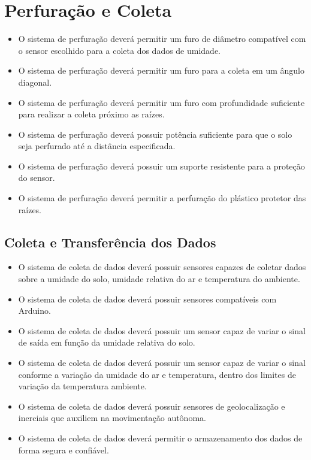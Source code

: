   \section{Perfuração e Coleta}

    \begin{itemize}
      \item O sistema de perfuração deverá permitir um furo de diâmetro compatível com o sensor escolhido para a coleta dos dados de umidade.
      \item O sistema de perfuração deverá permitir um furo para a coleta em um ângulo diagonal.
      \item O sistema de perfuração deverá permitir um furo com profundidade suficiente para realizar a coleta próximo as raízes.
      \item O sistema de perfuração deverá possuir potência suficiente para que o solo seja perfurado até a distância especificada.
      \item O sistema de perfuração deverá possuir um suporte resistente para a proteção do sensor.
      \item O sistema de perfuração deverá permitir a perfuração do plástico protetor das raízes.
    \end{itemize}

    \subsection{Coleta e Transferência dos Dados}

      \begin{itemize}
        \item O sistema de coleta de dados deverá possuir sensores capazes de coletar dados sobre a umidade do solo, umidade relativa do ar e temperatura do ambiente.
        \item O sistema de coleta de dados deverá possuir sensores compatíveis com Arduino.
        \item O sistema de coleta de dados deverá possuir um sensor capaz de variar o sinal de saída em função da umidade relativa do solo.
        \item O sistema de coleta de dados deverá possuir um sensor capaz de variar o sinal conforme a variação da umidade do ar e temperatura, dentro dos limites de variação da temperatura ambiente.
        \item O sistema de coleta de dados deverá possuir sensores de geolocalização e inerciais que auxiliem na movimentação autônoma.
        \item O sistema de coleta de dados deverá permitir o armazenamento dos dados de forma segura e confiável.
      \end{itemize}

